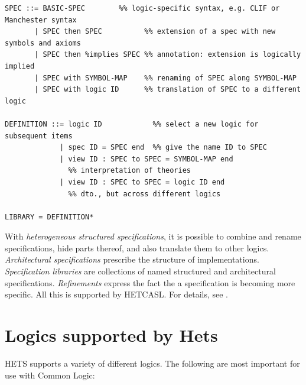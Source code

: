\documentclass{article}
\newcommand{\normalTEXTSC}[2]{{#1\scriptsize#2}}
\newcommand     {\Hets}{\normalTEXTSC{H}{ETS}\xspace}
\newcommand{\HetCASL}{\normalTEXTSC{H}{ET}\normalTEXTSC{C}{ASL}\xspace}
\begin{document}
\begin{lstlisting}[float,label={fig:lang},caption={Syntax of a simple subset of the heterogeneous specification language. \texttt{BASIC-SPEC} and \texttt{SYMBOL-MAP} have a logic specific syntax, while \texttt{ID} stands for some form of identifiers.},basicstyle=\ttfamily\small,morecomment={[l]{\%\%\ }},morekeywords={then,with,logic,spec,end,view,to},escapeinside={<>}]
SPEC ::= BASIC-SPEC        %% logic-specific syntax, e.g. CLIF or Manchester syntax
       | SPEC then SPEC          %% extension of a spec with new symbols and axioms
       | SPEC then %implies SPEC %% annotation: extension is logically implied
       | SPEC with SYMBOL-MAP    %% renaming of SPEC along SYMBOL-MAP
       | SPEC with logic ID      %% translation of SPEC to a different logic

DEFINITION ::= logic ID            %% select a new logic for subsequent items
             | spec ID = SPEC end  %% give the name ID to SPEC
             | view ID : SPEC to SPEC = SYMBOL-MAP end
               %% interpretation of theories
             | view ID : SPEC to SPEC = logic ID end
               %% dto., but across different logics

LIBRARY = DEFINITION*
\end{lstlisting}

With \emph{heterogeneous structured specifications}, it is possible to
combine and rename specifications, hide parts thereof, and also
translate them to other logics. \emph{Architectural specifications}
prescribe the structure of implementations.  \emph{Specification
  libraries} are collections of named structured and architectural
specifications. \emph{Refinements} express the fact the a specification
is becoming more specific. All this is supported by \HetCASL.
For details, see \cite{Mossakowski04,Habil,CASL/RefManual}.


\section{Logics supported by Hets}

\Hets supports a variety of different logics.   The following are most important for use with Common Logic:
\end{document}
